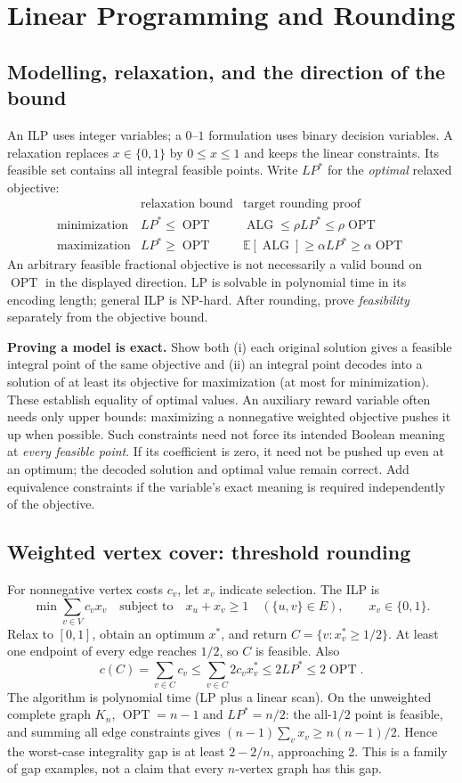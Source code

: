 \documentclass[10pt]{article}
\theoremstyle{definition}
\newcommand{\OPT}{\operatorname{OPT}}
\newcommand{\ALG}{\operatorname{ALG}}
\begin{document}
\section{Linear Programming and Rounding}\label{lp:main}

\subsection{Modelling, relaxation, and the direction of the bound}\label{lp:template}
An ILP uses integer variables; a $0$--$1$ formulation uses binary decision
variables. A relaxation replaces $x\in\{0,1\}$ by $0\le x\le1$ and keeps
the linear constraints. Its feasible set contains all integral feasible
points. Write $LP^*$ for the \emph{optimal} relaxed objective:
\[
  \begin{array}{c|c|c}
    &\text{relaxation bound}&\text{target rounding proof}\\\hline
    \text{minimization}&LP^*\le\OPT&\ALG\le\rho LP^*\le\rho\OPT\\
    \text{maximization}&LP^*\ge\OPT&
       \mathbb E[\ALG]\ge\alpha LP^*\ge\alpha\OPT
  \end{array}
\]
An arbitrary feasible fractional objective is not necessarily a valid bound
on $\OPT$ in the displayed direction. LP is solvable in polynomial time in
its encoding length; general ILP is NP-hard. After rounding, prove
\emph{feasibility} separately from the objective bound.

\textbf{Proving a model is exact.}
Show both (i) each original solution gives a feasible integral point of the
same objective and (ii) an integral point decodes into a solution of at least
its objective for maximization (at most for minimization). These establish
equality of optimal values. An auxiliary reward variable often needs only
upper bounds: maximizing a nonnegative weighted objective pushes it up when
possible. Such constraints need not force its intended Boolean meaning at
\emph{every feasible point}. If its coefficient is zero, it need not be
pushed up even at an optimum; the decoded solution and optimal value remain
correct. Add equivalence constraints if the variable's exact meaning is
required independently of the objective.

\subsection{Weighted vertex cover: threshold rounding}\label{lp:vc}
For nonnegative vertex costs $c_v$, let $x_v$ indicate selection. The ILP is
\[
  \min\sum_{v\in V}c_vx_v
  \quad\text{subject to}\quad
  x_u+x_v\ge1\quad(\{u,v\}\in E),\qquad x_v\in\{0,1\}.
\]
Relax to $[0,1]$, obtain an optimum $x^*$, and return
$C=\{v:x_v^*\ge1/2\}$. At least one endpoint of every edge reaches $1/2$,
so $C$ is feasible. Also
\[
  c(C)=\sum_{v\in C}c_v
    \le\sum_{v\in C}2c_vx_v^*
    \le2LP^*\le2\OPT.
\]
The algorithm is polynomial time (LP plus a linear scan).
On the unweighted complete graph $K_n$, $\OPT=n-1$ and $LP^*=n/2$:
the all-$1/2$ point is feasible, and summing all edge constraints gives
$(n-1)\sum_vx_v\ge n(n-1)/2$. Hence the worst-case integrality gap is
at least $2-2/n$, approaching 2. This is a family of gap examples, not a
claim that every $n$-vertex graph has this gap.
\end{document}
